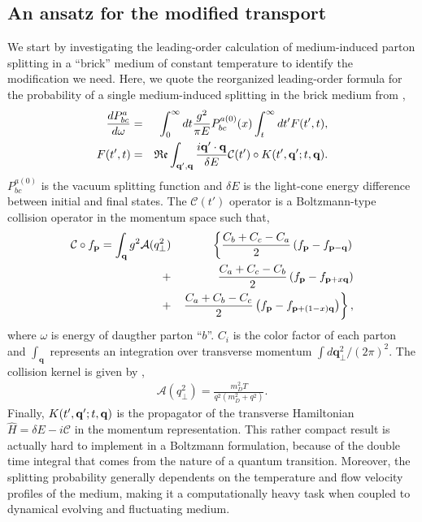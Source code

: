 \documentclass[aps, prc, reprint, amsmath, groupedaddress, nofootinbib]{revtex4-1}
\begin{document}
\subsection{An ansatz for the modified transport}
We start by investigating the leading-order calculation of medium-induced parton splitting in a ``brick'' medium of constant temperature to identify the modification we need.
Here, we quote the reorganized leading-order formula for the probability of a single medium-induced splitting in the brick medium from \cite{CaronHuot:2010bp},
\begin{eqnarray}
\frac{dP^{a}_{bc}}{d\omega} &=& \int_0^\infty dt \frac{g^2}{\pi E} P_{bc}^{a(0)}(x) \int_t^\infty dt'  F(t', t),
\label{eq:full-theory}
\\
F(t', t) &=& \mathfrak{Re} \int_{{\bf q}', {\bf q}} \frac{i {\bf q}'\cdot {\bf q}}{\delta E} \mathcal{C}(t') \circ K(t', {\bf q}'; t, {\bf q}).
\end{eqnarray}
$P_{bc}^{a(0)}$ is the vacuum splitting function and $\delta E$ is the light-cone energy difference between initial and final states. 
The $\mathcal{C}(t')$ operator is a Boltzmann-type collision operator in the momentum space such that,
\begin{eqnarray}
\mathcal{C}\circ f_{\mathbf{p}} = \int_{\bf q} g^2\mathcal{A}(q_\perp^2)
&&\left\{  \frac{C_b+C_c-C_a}{2}\left(f_{\bf p}-f_{{\bf p}-{\bf q}}\right) \right.\\\nonumber
 +&&    \frac{C_a+C_c-C_b}{2}\left(f_{\bf p}-f_{{\bf p}+x{\bf q}}\right) \\\nonumber
+&&  \left. \frac{C_a+C_b-C_c}{2}\left(f_{\bf p}-f_{{\bf p}+(1-x){\bf q}}\right)\right\},
\end{eqnarray}
where $\omega$ is energy of daugther parton ``$b$''.
$C_i$ is the color factor of each parton and $\int_{\mathbf{q}}$ represents an integration over transverse momentum $\int d\mathbf{q}_\perp^2/(2\pi)^2$.
The collision kernel is given by \cite{Aurenche:2002pd},
\begin{eqnarray}
\mathcal{A}(q_\perp^2) = \frac{m_D^2 T}{q^2\left(m_D^2+q^2\right)}.
\end{eqnarray}
Finally, $K(t', {\bf q}'; t, {\bf q})$ is the propagator of the transverse  Hamiltonian $\hat{H} = \delta E - i\mathcal{C}$ in the momentum representation.
This rather compact result is actually hard to implement in a Boltzmann formulation, because of the double time integral that comes from the nature of a quantum transition.
Moreover, the splitting probability generally dependents on the temperature and flow velocity profiles of the medium, making it a computationally heavy task when coupled to dynamical evolving and fluctuating medium.
\end{document}
